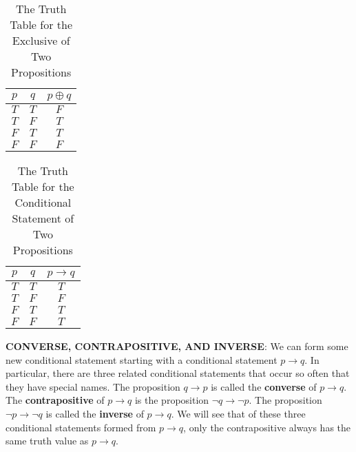 \documentclass[12pt, a4paper]{article} %
\begin{document}
\begin{minipage}[b]{0.45\textwidth}
    \centering
    \begin{table}[H]
        \centering
        \caption{The Truth Table for the Exclusive of Two Propositions}
        \begin{tabular}{cc|c}
            \toprule
            $p$ & $q$ & $p \oplus q$ \\
            \midrule
            $T$ & $T$ & $F$          \\
            $T$ & $F$ & $T$          \\
            $F$ & $T$ & $T$          \\
            $F$ & $F$ & $F$          \\
            \bottomrule
        \end{tabular}%
        \label{tab:4}%
    \end{table}%
\end{minipage}
\begin{minipage}[b]{0.45\textwidth}
    \centering
    \begin{table}[H]
        \centering
        \caption{The Truth Table for the Conditional Statement of Two Propositions}
        \begin{tabular}{cc|c}
            \toprule
            $p$ & $q$ & $p \to q$ \\
            \midrule
            $T$ & $T$ & $T$       \\
            $T$ & $F$ & $F$       \\
            $F$ & $T$ & $T$       \\
            $F$ & $F$ & $T$       \\
            \bottomrule
        \end{tabular}%
        \label{tab:5}%
    \end{table}%
\end{minipage}

\textbf{CONVERSE, CONTRAPOSITIVE, AND INVERSE}:
We can form some new conditional statement starting with a conditional statement $p \to q$. In particular, there are three related conditional statements that occur so often that they have special names. The proposition $q \to p$ is called the \textbf{converse} of $p \to q$. The \textbf{contrapositive} of $p \to q$ is the proposition $\neg q \to \neg p$. The proposition $\neg p \to \neg q$ is called the \textbf{inverse} of $p \to q$. We will see that of these three conditional statements formed from $p \to q$, only the contrapositive always has the same truth value as $p \to q$.
\end{document}
